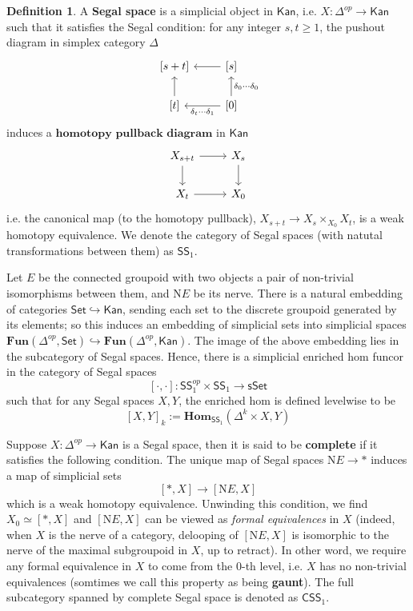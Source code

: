 \documentclass{article}
\theoremstyle{definition}
\newtheorem{mydef}{Definition}[section]
\theoremstyle{remark}
\begin{document}
\begin{mydef}
A \textbf{Segal space} is a simplicial object in $\mathsf{Kan}$, i.e. $X: \Delta^{op} \to \mathsf{Kan}$ such that it satisfies the Segal condition: for any integer $s,t \geq 1$, the pushout diagram in simplex category $\Delta$ $$ \begin{tikzcd}   {[s+t]}  & {[s]} \arrow[l] \\ {[t]} \arrow[u] & {[0]} \arrow[l, "\delta_{t} \cdots \delta_1"] \arrow[u, "\delta_0 \cdots \delta_0"']  \end{tikzcd} $$ induces a $\textbf{homotopy pullback diagram}$ in $\mathsf{Kan}$ $$ \begin{tikzcd} X_{s+t} \arrow[d] \arrow[r] & X_s \arrow[d] \\ X_t \arrow[r] & X_0 \end{tikzcd} $$ i.e. the canonical map (to the homotopy pullback), $ X_{s+t} \to X_s \times_{X_0} X_t $, is a weak homotopy equivalence. We denote the category of Segal spaces (with natutal transformations between them) as $\mathsf{SS}_1$.

Let $E$ be the connected groupoid with two objects a pair of non-trivial isomorphisms between them, and $\mathrm{N}E$ be its nerve. There is a natural embedding of categories $\mathsf{Set} \hookrightarrow \mathsf{Kan}$, sending each set to the discrete groupoid generated by its elements; so this induces an embedding of simplicial sets into simplicial spaces $\mathbf{Fun}(\Delta^{op},\mathsf{Set}) \hookrightarrow \mathbf{Fun}(\Delta^{op},\mathsf{Kan})$. The image of the above embedding lies in the subcategory of Segal spaces. Hence, there is a simplicial enriched hom funcor in the category of Segal spaces $$ [\cdot,\cdot]:\mathsf{SS}_1^{op} \times \mathsf{SS}_1 \to \mathsf{sSet} $$ such that for any Segal spaces $X,Y$, the enriched hom is defined levelwise to be $$[X,Y]_k:=\mathbf{Hom}_{\mathsf{SS}_1}(\Delta^k \times X,Y)$$

Suppose $X: \Delta^{op} \to \mathsf{Kan}$ is a Segal space, then it is said to be \textbf{complete} if it satisfies the following condition. The unique map of Segal spaces $\mathrm{N}E \to *$ induces a map of simplicial sets $$ [*,X] \to [\mathrm{N}E,X] $$ which is a weak homotopy equivalence. Unwinding this condition, we find $X_0 \simeq [*,X]$ and $[\mathrm{N}E,X]$ can be viewed as \textit{formal equivalences} in $X$ (indeed, when $X$ is the nerve of a category, delooping of $[\mathrm{N}E,X]$ is isomorphic to the nerve of the maximal subgroupoid in $X$, up to retract). In other word, we require any formal equivalence in $X$ to come from the $0$-th level, i.e. $X$ has no non-trivial equivalences (somtimes we call this property as being \textbf{gaunt}). The full subcategory spanned by complete Segal space is denoted as $\mathsf{CSS}_1$.

\end{mydef}
\end{document}
